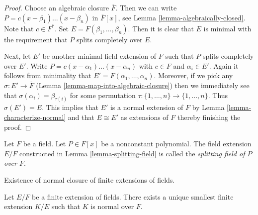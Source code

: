 \begin{proof}
Choose an algebraic closure $\overline{F}$. Then we can write
$P = c (x - \beta_1) \ldots (x - \beta_n)$ in $\overline{F}[x]$, see
Lemma \ref{lemma-algebraically-closed}. Note that $c \in F^*$. Set
$E = F(\beta_1, \ldots, \beta_n)$. Then it is clear that $E$ is
minimal with the requirement that $P$ splits completely over $E$.

\medskip\noindent
Next, let $E'$ be another minimal field extension of $F$ such that
$P$ splits completely over $E'$. Write
$P = c (x - \alpha_1) \ldots (x - \alpha_n)$ with $c \in F$ and
$\alpha_i \in E'$. Again it follows from minimality that
$E' = F(\alpha_1, \ldots, \alpha_n)$. Moreover, if we pick
any $\sigma : E' \to \overline{F}$
(Lemma \ref{lemma-map-into-algebraic-closure})
then we immediately see that $\sigma(\alpha_i) = \beta_{\tau(i)}$
for some permutation $\tau : \{1, \ldots, n\} \to \{1, \ldots, n\}$.
Thus $\sigma(E') = E$. This implies that $E'$ is a normal extension
of $F$ by Lemma \ref{lemma-characterize-normal}
and that $E \cong E'$ as extensions of $F$ thereby finishing the proof.
\end{proof}

\begin{definition}
\label{definition-splitting-field}
Let $F$ be a field. Let $P \in F[x]$ be a nonconstant polynomial.
The field extension $E/F$ constructed in Lemma \ref{lemma-splitting-field}
is called the {\it splitting field of $P$ over $F$}.
\end{definition}

\begin{lemma}
\label{lemma-normal-closure}
\begin{slogan}
Existence of normal closure of finite extensions of fields.
\end{slogan}
Let $E/F$ be a finite extension of fields. There exists a unique
smallest finite extension $K/E$ such that $K$ is normal over $F$.
\end{lemma}


